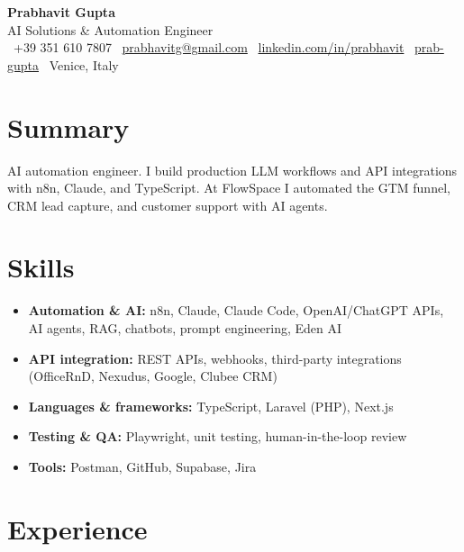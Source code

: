 \documentclass[a4paper,10pt]{article}
\begin{document}
\begin{center}
 {\Huge\bfseries Prabhavit Gupta}\\[3pt]
 {\color{accent}\large AI Solutions \& Automation Engineer}\\[5pt]
 \faPhone\ +39 351 610 7807 \quad
 \faEnvelope\ \href{mailto:prabhavitg@gmail.com}{prabhavitg@gmail.com} \quad
 \faLinkedin\ \href{https://www.linkedin.com/in/prabhavit/}{linkedin.com/in/prabhavit} \quad
 \faGithub\ \href{https://github.com/prab-gupta}{prab-gupta} \quad
 \faMapMarker*\ Venice, Italy
\end{center}

\section{Summary}
AI automation engineer. I build production LLM workflows and API integrations with n8n, Claude, and TypeScript. At FlowSpace I automated the GTM funnel, CRM lead capture, and customer support with AI agents.

\section{Skills}
\begin{itemize}
 \item \textbf{Automation \& AI:} n8n, Claude, Claude Code, OpenAI/ChatGPT APIs, AI agents, RAG, chatbots, prompt engineering, Eden AI
 \item \textbf{API integration:} REST APIs, webhooks, third-party integrations (OfficeRnD, Nexudus, Google, Clubee CRM)
 \item \textbf{Languages \& frameworks:} TypeScript, Laravel (PHP), Next.js
 \item \textbf{Testing \& QA:} Playwright, unit testing, human-in-the-loop review
 \item \textbf{Tools:} Postman, GitHub, Supabase, Jira
\end{itemize}

\section{Experience}
\end{document}
